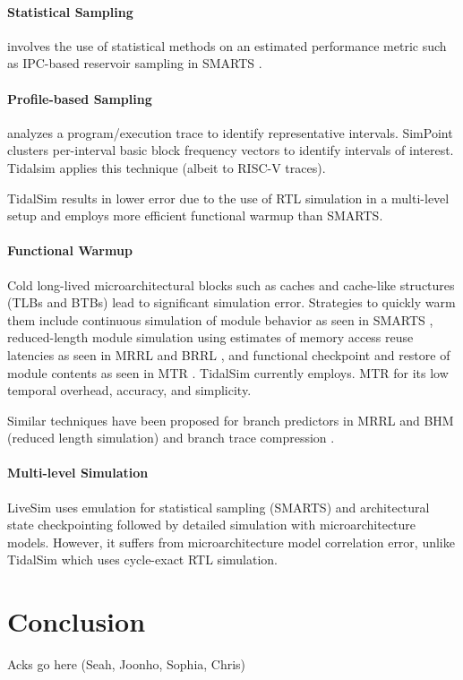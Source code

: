 \documentclass[sigplan,nonacm,10pt]{acmart}
\begin{document}
\paragraph{Statistical Sampling} involves the use of statistical methods on an estimated performance metric such as IPC-based reservoir sampling in SMARTS \cite{wunderlich2003smarts}.

\paragraph{Profile-based Sampling} analyzes a program/execution trace to identify representative intervals. SimPoint \cite{sherwood2002automatically} clusters per-interval basic block frequency vectors to identify intervals of interest. Tidalsim applies this technique (albeit to RISC-V traces).

TidalSim results in lower error due to the use of RTL simulation in a multi-level setup and employs more efficient functional warmup than SMARTS.

\paragraph{Functional Warmup} Cold long-lived microarchitectural blocks such as caches and cache-like structures (TLBs and BTBs) lead to significant simulation error. Strategies to quickly warm them include continuous simulation of module behavior as seen in SMARTS \cite{wunderlich2003smarts}, reduced-length module simulation using estimates of memory access reuse latencies as seen in MRRL \cite{haskins2003memory} and BRRL \cite{eeckhout2005blrl}, and functional checkpoint and restore of module contents as seen in MTR \cite{barr2005accelerating}. TidalSim currently employs. MTR for its low temporal overhead, accuracy, and simplicity.

Similar techniques have been proposed for branch predictors in MRRL and BHM \cite{kluyskens2007branch} (reduced length simulation) and branch trace compression \cite{barr2006branch}.

\paragraph{Multi-level Simulation} LiveSim \cite{hassani2016livesim} uses emulation for statistical sampling (SMARTS) and architectural state checkpointing followed by detailed simulation with microarchitecture models. However, it suffers from microarchitecture model correlation error, unlike TidalSim which uses cycle-exact RTL simulation.

\section{Conclusion}


\begin{acks}
Acks go here (Seah, Joonho, Sophia, Chris)
\end{acks}




\end{document}
